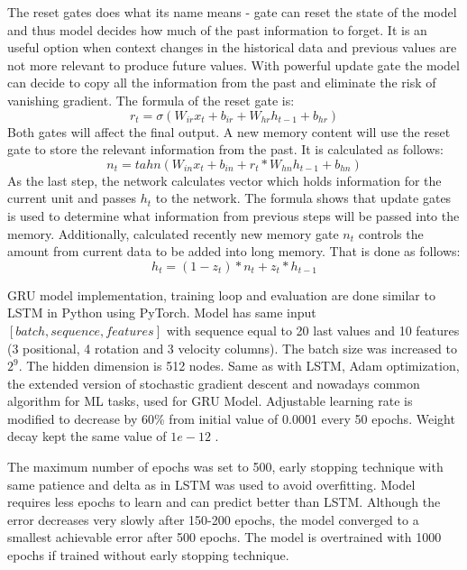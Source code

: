 The reset gates does what its name means - gate can reset the state of the model and thus model decides how much of the past information to forget. It is an useful option when context changes in the historical data and previous values are not more relevant to produce future values. With powerful update gate the model can decide to copy all the information from the past and eliminate the risk of vanishing gradient. The formula of the reset gate is:
\begin{equation}
r_t = \sigma (W_{ir}x_t + b_{ir} + W_{hr}h_{t-1} + b_{hr})
\end{equation}
Both gates will affect the final output. A new memory content will use the reset gate to store the relevant information from the past. It is calculated as follows:
\begin{equation}
n_t = tahn (W_{in}x_t + b_{in} + r_t * W_{hn}h_{t-1} + b_{hn})
\end{equation}
As the last step, the network calculates vector which holds information for the current unit and passes $h_t$ to the network. The formula shows that update gates is used to determine what information from previous steps will be passed into the memory. Additionally, calculated recently new memory gate $n_t$ controls the amount from current data to be added into long memory.  That is done as follows:
\begin{equation}
h_t = (1 - z_t) * n_t + z_t * h_{t-1}
\end{equation}

GRU model implementation, training loop and evaluation are done similar to LSTM in Python using PyTorch. Model has same input $[batch, sequence, features]$ with sequence equal to 20 last values and 10 features (3 positional, 4 rotation and 3 velocity columns). The batch size was increased to $2^{9}$. The hidden dimension  is 512 nodes. Same as with LSTM, Adam optimization, the extended version of stochastic gradient descent and nowadays common algorithm for ML tasks, used for GRU Model.  Adjustable learning rate is modified to decrease by 60\% from initial value of 0.0001 every 50 epochs. Weight decay kept the same value of $1e-12$ . 

The maximum number of epochs was set to 500, early stopping technique with same patience and delta as in LSTM was used to avoid overfitting. Model requires less epochs to learn and can predict better than LSTM. Although the error decreases very slowly after 150-200 epochs, the model converged to a smallest achievable error after 500 epochs. The model is overtrained with 1000 epochs if trained without early stopping technique.

